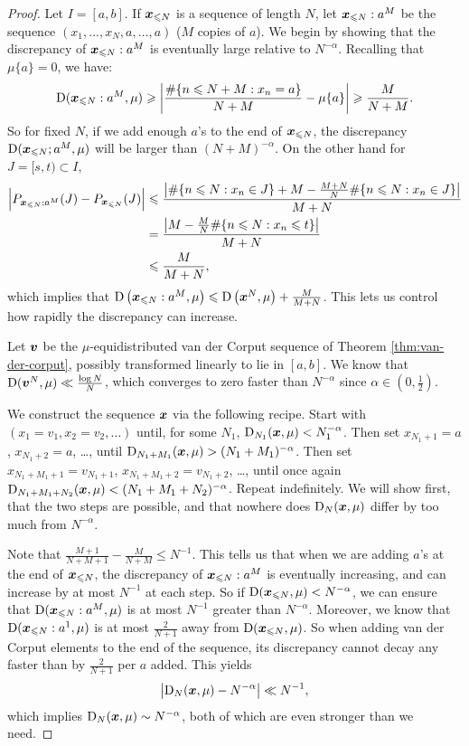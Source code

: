 \begin{proof}
Let $I = [a,b]$. If ${\boldsymbol x}_{\leqslant N}$ is a sequence of length $N$, let 
${\boldsymbol x}_{\leqslant N}: a^M$ be the sequence $(x_1,\dots,x_N,a,\dots,a)$ ($M$ copies 
of $a$). We begin by showing that the discrepancy of ${\boldsymbol x}_{\leqslant N}:a^M$ 
is eventually large relative to $N^{-\alpha}$. Recalling that $\mu\{a\} = 0$, 
we have:
\[
	\operatorname{D}({\boldsymbol x}_{\leqslant N}: a^M,\mu)
		\geqslant \left| \frac{\#\{ n\leqslant N+M : x_n = a\}}{N+M} - \mu\{a\}\right| 
		\geqslant \frac{M}{N+M} .
\]
So for fixed $N$, if we add enough $a$'s to the end of ${\boldsymbol x}_{\leqslant N}$, the 
discrepancy $\operatorname{D}({\boldsymbol x}_{\leqslant N};a^M,\mu)$ will be larger than 
$(N+M)^{-\alpha}$. On the other hand for $J = [s,t)\subset I$, 
\begin{align*}
	\left| P_{{\boldsymbol x}_{\leqslant N}: a^M}(J) - P_{{\boldsymbol x}_{\leqslant N}}(J)\right| 
		&\leqslant \frac{\left|\#\{n\leqslant N : x_n\in J\} + M - \frac{M+N}{N}\#\{n\leqslant N : x_n\in J\}\right|}{M+N} \\
		&= \frac{\left|M - \frac{M}{N} \#\{n\leqslant N : x_n \leqslant t\} \right|}{M+N} \\
		&\leqslant \frac{M}{M+N} ,
\end{align*}
which implies that 
$\operatorname{D}\left({\boldsymbol x}_{\leqslant N}: a^M,\mu\right) \leqslant \operatorname{D}\left({\boldsymbol x}^N,\mu\right) + \frac{M}{M+N}$. This lets us control how rapidly the discrepancy can increase. 

Let ${\boldsymbol v}$ be the $\mu$-equidistributed van der Corput sequence of 
Theorem \ref{thm:van-der-corput}, possibly transformed linearly to lie in 
$[a,b]$. We know that $\operatorname{D}({\boldsymbol v}^N, \mu) \ll \frac{\log N}{N}$, which converges 
to zero faster than $N^{-\alpha}$ since $\alpha\in \left(0,\frac 1 2\right)$. 

We construct the sequence ${\boldsymbol x}$ via the following recipe. Start with 
$(x_1 = v_1,x_2 = v_2,\dots)$ until, for some $N_1$, 
$\operatorname{D}_{N_1}({\boldsymbol x},\mu) < N_1^{-\alpha}$. Then set $x_{N_1+1} = a$, 
$x_{N_1+2} = a$, \dots, until 
$\operatorname{D}_{N_1+M_1}({\boldsymbol x},\mu) > (N_1+M_1)^{-\alpha}$. Then set 
$x_{N_1+M_1+1} = v_{N_1+1}$, $x_{N_1+M_1+2} = v_{N_1+2}$, \dots, 
until once again 
$\operatorname{D}_{N_1+M_1+N_2}({\boldsymbol x},\mu) < (N_1+M_1+N_2)^{-\alpha}$. Repeat 
indefinitely. We will show first, that the two steps are possible, and that 
nowhere does $\operatorname{D}_N({\boldsymbol x},\mu)$ differ by too much from $N^{-\alpha}$. 

Note that $\frac{M+1}{N+M+1} - \frac{M}{N+M} \leqslant N^{-1}$. This tells 
us that when we are adding $a$'s at the end of ${\boldsymbol x}_{\leqslant N}$, the 
discrepancy of 
${\boldsymbol x}_{\leqslant N}: a^M$ is eventually increasing, and can increase by at most 
$N^{-1}$ at each 
step. So if $\operatorname{D}({\boldsymbol x}_{\leqslant N},\mu) < N^{-\alpha}$, we can ensure that 
$\operatorname{D}({\boldsymbol x}_{\leqslant N}: a^M,\mu)$ is at most $N^{-1}$ greater than 
$N^{-\alpha}$. 
Moreover, we know that $\operatorname{D}({\boldsymbol x}_{\leqslant N}: a^1,\mu)$ is at most 
$\frac{2}{N+1}$ away from $\operatorname{D}({\boldsymbol x}_{\leqslant N},\mu)$. So when adding van der 
Corput elements to the end of the sequence, its discrepancy cannot decay any 
faster than by $\frac{2}{N+1}$ per $a$ added. This yields 
\[
	\left|\operatorname{D}_N({\boldsymbol x},\mu) - N^{-\alpha}\right| \ll N^{-1} , 
\]
which implies $\operatorname{D}_N({\boldsymbol x},\mu) \sim N^{-\alpha}$, both of which are even 
stronger than we need.
\end{proof}
